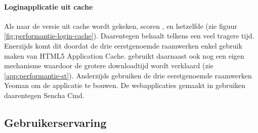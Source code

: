 \paragraph{Loginapplicatie uit cache}
Als naar de versie uit cache wordt gekeken, scoren \kendo{}, \jqm{} en \lungo{} hetzelfde (zie figuur \ref{fig:performantie-login-cache}).
Daarentegen behaalt \st{} telkens een veel tragere tijd.
Enerzijds komt dit doordat de drie eerstgenoemde raamwerken enkel gebruik maken van HTML5 Application Cache.
\st{} gebruikt daarnaast ook nog een eigen mechanisme waardoor de grotere downloadtijd wordt verklaard (zie \ref{app:performantie-st}).
Anderzijds gebruiken de drie eerstgenoemde raamwerken Yeoman om de applicatie te bouwen.
De webapplicaties gemaakt in \st{} gebruiken daarentegen Sencha Cmd.


\subsection{Gebruikerservaring}
\label{sec:evaluatie-gebruikerservaring}

\begin{table}
\centering
{}
\caption{Gebruikerservaring van het scrollen door een lange lijst.}
\label{tabel:evaluatie-performantie-gebruikerservaring}
\end{table}


